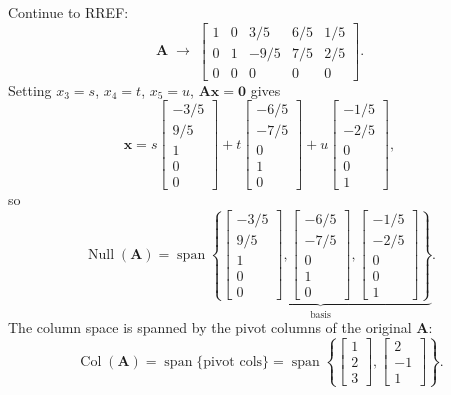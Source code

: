 \begin{example}
  Continue to RREF:
  \[
    \mathbf{A}
    \;\rightarrow\;
    \begin{bmatrix}
      1 & 0 & 3/5 & 6/5 & 1/5 \\ 0 & 1 & -9/5 & 7/5 & 2/5 \\ 0 & 0 & 0 & 0 & 0
    \end{bmatrix}
    .
  \]
  Setting $x_3 = s$, $x_4 = t$, $x_5 = u$, $\mathbf{A}\mathbf{x} = \mathbf{0}$ gives
  \[
    \mathbf{x}
    = s
    \begin{bmatrix}
      -3/5 \\ 9/5 \\ 1 \\ 0 \\ 0
    \end{bmatrix}
    + t
    \begin{bmatrix}
      -6/5 \\ -7/5 \\ 0 \\ 1 \\ 0
    \end{bmatrix}
    + u
    \begin{bmatrix}
      -1/5 \\ -2/5 \\ 0 \\ 0 \\ 1
    \end{bmatrix}
    ,
  \]
  so
  \[
    \operatorname{Null}(\mathbf{A})
    = \operatorname{span}\underbrace{\left\{
      \begin{bmatrix}
        -3/5 \\ 9/5 \\ 1 \\ 0 \\ 0
      \end{bmatrix}
      ,
      \begin{bmatrix}
        -6/5 \\ -7/5 \\ 0 \\ 1 \\ 0
      \end{bmatrix}
      ,
      \begin{bmatrix}
        -1/5 \\ -2/5 \\ 0 \\ 0 \\ 1
      \end{bmatrix}
      \right\}}_{\text{basis}}.
  \]
  The column space is spanned by the pivot columns of the original $\mathbf{A}$:
  \[
    \operatorname{Col}(\mathbf{A})
    = \operatorname{span}\{\text{pivot cols}\}
    = \operatorname{span}\left\{
    \begin{bmatrix}
      1 \\ 2 \\ 3
    \end{bmatrix}
    ,
    \begin{bmatrix}
      2 \\ -1 \\ 1
    \end{bmatrix}
    \right\}.
  \]
\end{example}
